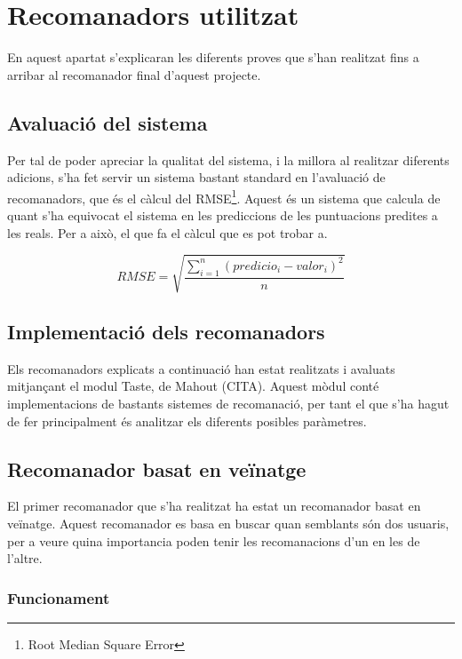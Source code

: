 \chapter{Recomanadors utilitzat}

En aquest apartat s'explicaran les diferents proves que s'han realitzat fins a arribar al recomanador final d'aquest projecte.

\section{Avaluació del sistema}

Per tal de poder apreciar la qualitat del sistema, i la millora al realitzar diferents adicions, s'ha fet servir un sistema bastant standard en l'avaluació de recomanadors, que és el càlcul del RMSE\footnote{Root Median Square Error}. Aquest és un sistema que calcula de quant s'ha equivocat el sistema en les prediccions de les puntuacions predites a les reals. Per a això, el que fa el càlcul que es pot trobar a. %

\begin{equation}
RMSE=\sqrt{\frac{\sum_{i=1}^{n}{(predicio_i - valor_i)}^2}{n}}
\end{equation}

\section{Implementació dels recomanadors}

Els recomanadors explicats a continuació han estat realitzats i avaluats mitjançant el modul Taste, de Mahout (CITA). Aquest mòdul conté implementacions de bastants sistemes de recomanació, per tant el que s'ha hagut de fer principalment és analitzar els diferents posibles paràmetres.


\section{Recomanador basat en veïnatge}

El primer recomanador que s'ha realitzat ha estat un recomanador basat en veïnatge. Aquest recomanador es basa en buscar quan semblants són dos usuaris, per a veure quina importancia poden tenir les recomanacions d'un en les de l'altre.

\subsection{Funcionament}


